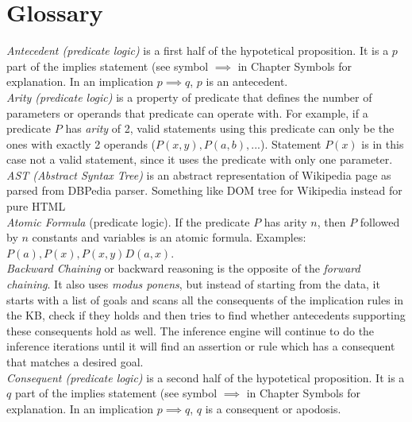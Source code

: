 % 
\chapter{Glossary}
\emph{Antecedent (predicate logic)} is a first half of the hypotetical 
proposition. It is a $p$ part of the implies statement (see symbol $\implies$ in
Chapter Symbols for explanation. In an implication $p \implies q$, $p$ is an
antecedent.\\

\emph{Arity (predicate logic)} is a property of predicate that defines the 
number of parameters or operands that predicate can operate with. For example,
if a predicate $P$ has \emph{arity} of 2, valid statements using this predicate
can only be the ones with exactly 2 operands ($P(x,y), P(a,b),...$). Statement
$P(x)$ is in this case not a valid statement, since it uses the predicate with
only one parameter.\\

\emph{AST (Abstract Syntax Tree)} is an abstract representation of Wikipedia 
page as parsed from DBPedia parser. Something like DOM tree for Wikipedia 
instead for pure HTML\\

\emph{Atomic Formula} (predicate logic). If the predicate $P$ has arity $n$,
then $P$ followed by $n$ constants and variables is an atomic formula. Examples:
$P(a), P(x), P(x,y) D(a,x)$.\\

\emph{Backward Chaining} or backward reasoning is the opposite of the 
\emph{forward chaining}. It also uses \emph{modus ponens}, but instead of 
starting from the data, it starts with a list of goals and scans all the 
consequents of the implication rules in the KB, check if they holds and then
tries to find whether antecedents supporting these consequents hold as well.
The inference engine will continue to do the inference iterations until it will
find an assertion or rule which has a consequent that matches a desired goal.\\

\emph{Consequent (predicate logic)} is a second half of the hypotetical 
proposition. It is a $q$ part of the implies statement (see symbol $\implies$ in
Chapter Symbols for explanation. In an implication $p \implies q$, $q$ is a
consequent or apodosis.\\

